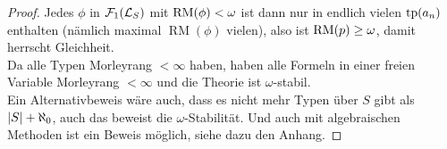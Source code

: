 \begin{proof}
        Jedes $\phi$ in $\mathcal{F}_1(\mathcal{L}_S)$ mit $\operatorname{RM}(\phi)<\omega$ ist dann nur in endlich vielen $\operatorname{tp}(a_n)$ enthalten (nämlich maximal $\operatorname{RM}(\phi)$ vielen), also ist $\operatorname{RM}(p)\geq\omega$, damit herrscht Gleichheit.\\
        Da alle Typen Morleyrang $<\infty$ haben, haben alle Formeln in einer freien Variable Morleyrang $<\infty$ und die Theorie ist $\omega$-stabil.\\
        Ein Alternativbeweis wäre auch, dass es nicht mehr Typen über $S$ gibt als ${\left| S \right|}+\aleph_0$, auch das beweist die $\omega$-Stabilität. Und auch mit algebraischen Methoden ist ein Beweis möglich, siehe dazu den Anhang.
    \end{proof}